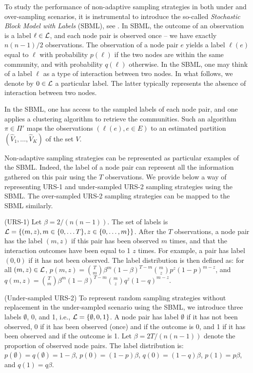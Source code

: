 \documentclass[12pt]{colt}%
\begin{document}
To study the performance of non-adaptive sampling strategies in both under and over-sampling scenarios, it is instrumental to introduce the so-called {\it Stochastic Block Model with Labels} (SBML), see \cite{heimlicher2012community}. In SBML, the outcome of an observation is a label $\ell\in {\cal L}$, and each node pair is observed once -- we have exactly $n(n-1)/2$ observations. The observation of a node pair $e$ yields a label $\ell(e)$ equal to $\ell$ with probability $p(\ell)$ if the two nodes are within the same community, and with probability $q(\ell)$ otherwise. In the SBML, one may think of a label $\ell$ as a type of interaction between two nodes. In what follows, we denote by $0\in {\cal L}$ a particular label. The latter typically represents the absence of interaction between two nodes.

In the SBML, one has access to the sampled labels of each node pair, and one applies a clustering algorithm to retrieve the communities. Such an algorithm $\pi\in \Pi'$ maps the observations $(\ell(e), e\in E)$ to an estimated partition $(\hat{V}_1,\ldots,\hat{V}_K)$ of the set $V$.

Non-adaptive sampling strategies can be represented as particular examples of the SBML. Indeed, the label of a node pair can represent all the information gathered on this pair using the $T$ observations. We provide below a way of representing URS-1 and under-sampled URS-2 sampling strategies using the SBML. The over-sampled URS-2 sampling strategies can be mapped to the SBML similarly. 


\begin{example} (URS-1) Let $\beta=2/(n(n-1))$. The set of labels is ${\cal L}=\{(m,z),m\in \{0,\ldots T\}, z\in\{0,\ldots,m\}\}$. After the $T$ observations, a node pair has the label $(m,z)$ if this pair has been observed $m$ times, and that the interaction outcomes have been equal to 1 $z$ times. For example, a pair has label  $(0,0)$ if it has not been observed. The label distribution is then defined as: for all $(m,z)\in {\cal L}$, $p(m,z)={T\choose m}\beta^m(1-\beta)^{T-m} {m\choose z}p^z(1-p)^{m-z}$, and $q(m,z)={T\choose m}\beta^m(1-\beta)^{T-m} {m\choose z}q^z(1-q)^{m-z}.$
\end{example}

\begin{example} (Under-sampled URS-2) To represent random sampling strategies without replacement in the under-sampled scenario using the SBML, we introduce three labels $\emptyset$, 0, and 1, i.e., ${\cal L}=\{\emptyset, 0, 1\}$. A node pair has label $\emptyset$ if it has not been observed, 0 if it has been observed (once) and if the outcome is 0, and 1 if it has been observed and if the outcome is 1. Let $\beta=2T/(n(n-1))$ denote the proportion of observed node pairs. The label distribution is: $p(\emptyset)=q(\emptyset)=1-\beta$, $p(0)=(1-p)\beta$, $q(0)=(1-q)\beta$, $p(1)=p\beta$, and $q(1)=q\beta$. 
\end{example}
\end{document}
